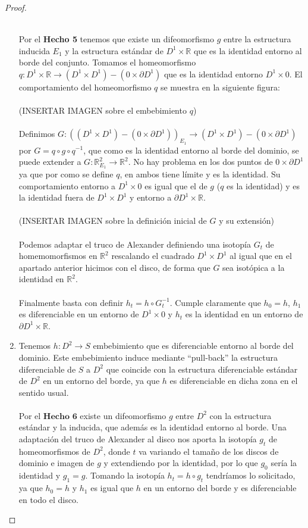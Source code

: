 \begin{proof}
\begin{enumerate}
			\\ Por el \textbf{Hecho 5} tenemos que existe un difeomorfismo $g$ entre la estructura inducida $E_1$ y la estructura estándar de $D^1\times \mathbb{R}$ que es la identidad entorno al borde del conjunto. Tomamos el homeomorfismo $q: D^1\times \mathbb{R} \rightarrow (D^1\times D^1) - (0 \times \partial D^1)$ que es la identidad entorno $D^1\times 0$. El comportamiento del homeomorfismo $q$ se muestra en la siguiente figura:\\
			\\ (INSERTAR IMAGEN sobre el embebimiento $q$)\\
			\\ Definimos $G:  ((D^1\times D^1) - (0 \times \partial D^1))_{E_1} \rightarrow (D^1\times D^1) - (0 \times \partial D^1)$ por $G = q \circ g \circ q^{-1}$, que como es la identidad entorno al borde del dominio, se puede extender a $G:\mathbb{R}^2_{E_1} \rightarrow \mathbb{R}^2$. No hay problema en los dos puntos de $0 \times \partial D^1$ ya que por como se define $q$, en ambos tiene límite y es la identidad. Su comportamiento entorno a $D^1 \times 0$ es igual que el de $g$ ($q$ es la identidad) y es la identidad fuera de $D^1 \times D^1$ y entorno a $\partial D^1 \times \mathbb{R}$.\\
			\\ (INSERTAR IMAGEN sobre la definición inicial de $G$ y su extensión)\\
			\\Podemos adaptar el truco de Alexander definiendo una isotopía $G_t$ de homemomorfismos en $\mathbb{R}^2$ rescalando el cuadrado $D^1 \times D^1$ al igual que en el apartado anterior hicimos con el disco, de forma que $G$ sea isotópica a la identidad en $\mathbb{R}^2$.\\
			\\ Finalmente basta con definir $h_t = h \circ G_t^{-1}$. Cumple claramente que $h_0 = h$, $h_1$ es diferenciable en un entorno de $D^1 \times 0$ y $h_t$ es la identidad en un entorno de $\partial D^1 \times \mathbb{R}$.
		\item Tenemos $h: D^2 \rightarrow S$ embebimiento que es diferenciable entorno al borde del dominio. Este embebimiento induce mediante ``pull-back'' la estructura diferenciable de $S$ a $D^2$ que coincide con la estructura diferenciable estándar de $D^2$ en un entorno del borde, ya que $h$ es diferenciable en dicha zona en el sentido usual.\\
			\\ Por el $\textbf{Hecho 6}$ existe un difeomorfismo $g$ entre $D^2$ con la estructura estándar y la inducida, que además es la identidad entorno al borde. Una adaptación del truco de Alexander al disco nos aporta la isotopía $g_t$ de homeomorfismos de $D^2$, donde $t$ va variando el tamaño de los discos de dominio e imagen de $g$ y extendiendo por la identidad, por lo que $g_0$ sería la identidad y $g_1 = g$. Tomando la isotopía $h_t = h \circ g_t$ tendríamos lo solicitado, ya que $h_0 = h$ y $h_1$ es igual que $h$ en un entorno del borde y es diferenciable en todo el disco.
	\end{enumerate}
	
\end{proof}


